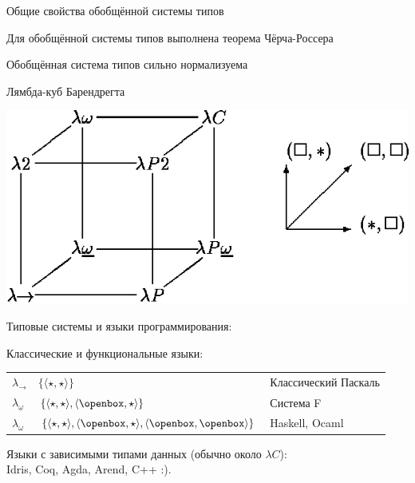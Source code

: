 \documentclass[aspectratio=169]{beamer}
\begin{document}
\begin{frame}{Общие свойства обобщённой системы типов}
\begin{thm}Для обобщённой системы типов выполнена теорема Чёрча-Россера\end{thm}
\begin{thm}Обобщённая система типов сильно нормализуема\end{thm}
\end{frame}

\begin{frame}{Лямбда-куб Барендрегта}
\begin{center}
    {\includegraphics[scale=0.3]{lection-04-cube.png}}
\end{center}
Типовые системы и языки программирования:

Классические и функциональные языки:
\begin{tabular}{lll}
$\lambda_\rightarrow$ & $\{\langle \star,\star \rangle\}$ & Классический Паскаль\\
$\lambda_{\underline{\omega}}$&$\{\langle \star,\star \rangle, \langle \openbox,\star\rangle\}$ & Система F\\
$\lambda_\omega$&$\{\langle \star,\star \rangle, \langle \openbox,\star\rangle, \langle \openbox,\openbox\rangle\}$ & Haskell, Ocaml
\end{tabular}

\vspace{0.3cm}
Языки с зависимыми типами данных (обычно около $\lambda C$):\\
Idris, Coq, Agda, Arend, C++ :).
\end{frame}
\end{document}
